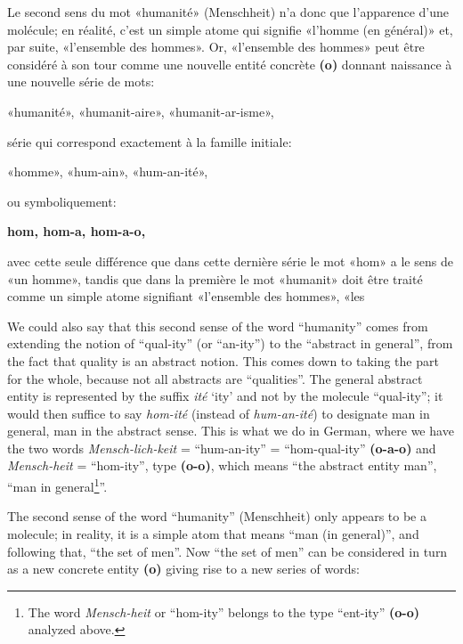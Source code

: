 \begin{sloppypar}
{{     Le second sens du mot «humanité» (Menschheit) n’a donc que
     l’apparence d'une molécule; en réalité, c'est un simple atome qui
     signifie «l’homme (en général)» et, par suite, «l'ensemble des
     hommes». Or, «l’ensemble des hommes» peut être considéré à son
     tour comme une nouvelle entité concrète \textbf{(o)}
     donnant naissance à une nouvelle série de mots:

    \begin{center}
      {\footnotesize«humanité», «humanit-aire», «humanit-ar-isme»,}
    \end{center}
    série qui correspond exactement à la famille initiale:

    \begin{center}
      «homme», «hum-ain», «hum-an-ité»,
    \end{center}
    ou symboliquement:

    \begin{center}
      \textbf{hom, hom-a, hom-a-o,}
    \end{center}
    avec cette seule différence que dans cette dernière série le mot
    «hom» a le sens de «un homme», tandis que dans la première le mot
    «humanit» doit être traité comme un simple atome signifiant
    «l’ensemble des hommes», «les}%

}
% 
{{\small
    We could also say that this second sense of the word ``humanity''
    comes from extending the notion of ``qual-ity'' (or ``an-ity'') to
    the ``abstract in general'', from the fact that quality is an
    abstract notion. This comes down to taking the part for the whole,
    because not all abstracts are ``qualities''. The general abstract
    entity is represented by the suffix \emph{ité} `ity' and not by the
    molecule ``qual-ity''; it would then suffice to say \emph{hom-ité}
    (instead of \emph{hum-an-ité}) to designate man in general, man in
    the abstract sense. This is what we do in German, where we have
    the two words \emph{Mensch-lich-keit} = ``hum-an-ity'' =
    ``hom-qual-ity'' \textbf{(o-a-o)} and \emph{Mensch-heit} =
    ``hom-ity'', type \textbf{(o-o)}, which means ``the
    abstract entity man'', ``man in general\footnote{The word
      \emph{Mensch-heit} or ``hom-ity'' belongs to the type ``ent-ity''
      \textbf{(o-o)} analyzed above.}''.

    The second sense of the word ``humanity'' (Menschheit) only
    appears to be a molecule; in reality, it is a simple atom that
    means ``man (in general)'', and following that, ``the set of
    men''. Now ``the set of men'' can be considered in turn as a new
    concrete entity \textbf{(o)} giving rise to a new series
    of words:

}}
\end{sloppypar}

